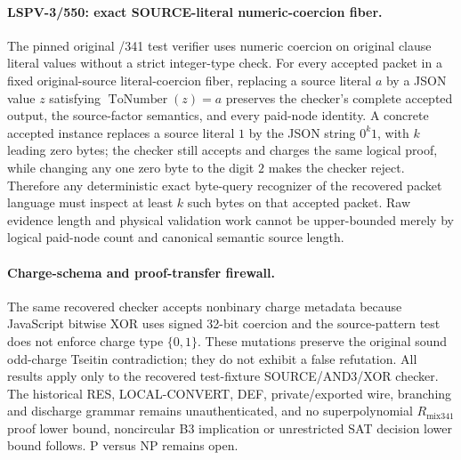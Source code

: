 \paragraph{LSPV-3/550: exact SOURCE-literal numeric-coercion fiber.}
The pinned original /341 test verifier uses numeric coercion on original
clause literal values without a strict integer-type check. For every accepted
packet in a fixed original-source literal-coercion fiber, replacing a source
literal $a$ by a JSON value $z$ satisfying
$\operatorname{ToNumber}(z)=a$ preserves the checker's complete accepted output,
the source-factor semantics, and every paid-node identity. A concrete
accepted instance replaces a source literal $1$ by the JSON string $0^k1$,
with $k$ leading zero bytes; the checker still accepts and charges the same
logical proof, while changing any one zero byte to the digit $2$ makes the
checker reject. Therefore any deterministic exact byte-query recognizer of
the recovered packet language must inspect at least $k$ such bytes on that
accepted packet. Raw evidence length and physical validation work cannot
be upper-bounded merely by logical paid-node count and canonical semantic
source length.
\paragraph{Charge-schema and proof-transfer firewall.}
The same recovered checker accepts nonbinary charge metadata because
JavaScript bitwise XOR uses signed 32-bit coercion and the source-pattern test
does not enforce charge type $\{0,1\}$. These mutations preserve the original
sound odd-charge Tseitin contradiction; they do not exhibit a false refutation.
All results apply only to the recovered test-fixture SOURCE/AND3/XOR checker.
The historical RES, LOCAL-CONVERT, DEF, private/exported wire, branching
and discharge grammar remains unauthenticated, and no superpolynomial
$R_{\mathrm{mix341}}$ proof lower bound, noncircular B3 implication or
unrestricted SAT decision lower bound follows. P versus NP remains open.
